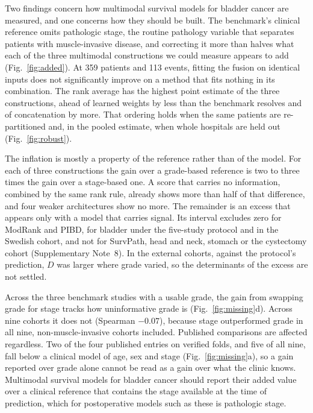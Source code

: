 \documentclass[pdflatex,sn-nature]{sn-jnl}
\begin{document}
Two findings concern how multimodal survival models for bladder cancer are measured, and one
concerns how they should be built. The benchmark's clinical reference omits pathologic stage, the
routine pathology variable that separates patients with muscle-invasive disease, and correcting it
more than halves what each of the three multimodal constructions we could measure appears to add
(Fig.~\ref{fig:added}). At 359 patients and 113 events, fitting the fusion on identical inputs does
not significantly improve on a method that fits nothing in its combination. The rank average has the
highest point estimate of the three constructions, ahead of learned weights by less than the
benchmark resolves and of concatenation by more. That ordering holds when the same patients are
re-partitioned and, in the pooled estimate, when whole hospitals are held out
(Fig.~\ref{fig:robust}).

The inflation is mostly a property of the reference rather than of the model. For each of three
constructions the gain over a grade-based reference is two to three times the gain over a
stage-based one. A score that carries no information, combined by the same rank rule, already shows
more than half of that difference, and four weaker architectures show no more. The remainder is an
excess that appears only with a model that carries signal. Its interval excludes zero for ModRank
and PIBD, for bladder under the five-study protocol and in the Swedish cohort, and not for SurvPath,
head and neck, stomach or the cystectomy cohort (Supplementary Note~8). In the external cohorts,
against the protocol's prediction, $D$ was larger where grade varied, so the determinants of the
excess are not settled.

Across the three benchmark studies with a usable grade, the gain from swapping grade for stage tracks
how uninformative grade is (Fig.~\ref{fig:missing}d). Across nine cohorts it does not (Spearman
$-0.07$), because stage outperformed grade in all nine, non-muscle-invasive cohorts included. Published comparisons are affected regardless. Two of the four published entries on verified folds, and five of all
nine, fall below a clinical model of age, sex and stage (Fig.~\ref{fig:missing}a), so a gain
reported over grade alone cannot be read as a gain over what the clinic knows. Multimodal survival
models for bladder cancer should report their added value over a clinical reference that contains
the stage available at the time of prediction, which for postoperative models such as these is
pathologic stage.
\end{document}

